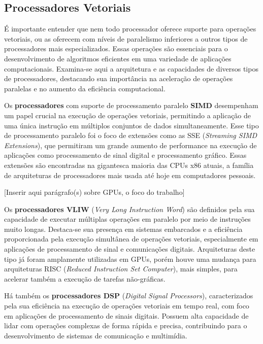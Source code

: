 \documentclass[12pt, %
openright, 
oneside, %
a4paper,    %
brazil]{facom-ufu-abntex2}
\begin{document}




\subsection{Processadores Vetoriais}

É importante entender que nem todo processador oferece suporte para operações vetoriais, ou as oferecem com níveis de paralelismo inferiores a outros tipos de processadores mais especializados. Essas operações são essenciais para o desenvolvimento de algoritmos eficientes em uma variedade de aplicações computacionais. Examina-se aqui a arquitetura e as capacidades de diversos tipos de processadores, destacando sua importância na aceleração de operações paralelas e no aumento da eficiência computacional.

Os \textbf{processadores} com suporte de processamento paralelo \textbf{SIMD} desempenham um papel crucial na execução de operações vetoriais, permitindo a aplicação de uma única instrução em múltiplos conjuntos de dados simultaneamente. Esse tipo de processamento paralelo foi o foco de extensões como as SSE (\textit{Streaming SIMD Extensions}), que permitiram um grande aumento de performance na execução de aplicações como processamento de sinal digital e processamento gráfico. Essas extensões são encontradas na gigantesca maioria das CPUs x86 atuais, a família de arquiteturas de processadores mais usada até hoje em computadores pessoais.

[Inserir aqui parágrafo(s) sobre GPUs, o foco do trabalho]

Os \textbf{processadores VLIW} (\textit{Very Long Instruction Word}) são definidos pela sua capacidade de executar múltiplas operações em paralelo por meio de instruções muito longas. Destaca-se sua presença em sistemas embarcados e a eficiência proporcionada pela execução simultânea de operações vetoriais, especialmente em aplicações de processamento de sinal e comunicações digitais. Arquiteturas deste tipo já foram amplamente utilizadas em GPUs, porém houve uma mudança para arquiteturas RISC (\textit{Reduced Instruction Set Computer}), mais simples, para acelerar também a execução de tarefas não-gráficas.

Há também os \textbf{processadores DSP} (\textit{Digital Signal Processors}), caracterizados pela sua eficiência na execução de operações vetoriais em tempo real, com foco em aplicações de processamento de sinais digitais. Possuem alta capacidade de lidar com operações complexas de forma rápida e precisa, contribuindo para o desenvolvimento de sistemas de comunicação e multimídia.
\end{document}
